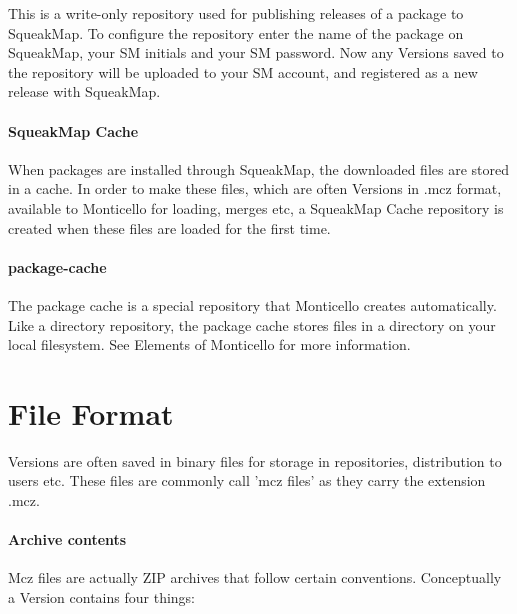 \documentclass[a4paper,10pt,twoside]{book}
\begin{document}
This is a write-only repository used for publishing releases of a package to SqueakMap. To configure the repository enter the name of the package on SqueakMap, your SM initials and your SM password. Now any Versions saved to the repository will be uploaded to your SM account, and registered as a new release with SqueakMap.

\paragraph{SqueakMap Cache}

When packages are installed through SqueakMap, the downloaded files are stored in a cache. In order to make these files, which are often Versions in .mcz format, available to Monticello for loading, merges etc, a SqueakMap Cache repository is created when these files are loaded for the first time.

\paragraph{package-cache}

The package cache is a special repository that Monticello creates automatically. Like a directory repository, the package cache stores files in a directory on your local filesystem. See Elements of Monticello for more information.


\section{File Format}

Versions are often saved in binary files for storage in repositories, distribution to users etc. These files are commonly call 'mcz files' as they carry the extension .mcz.

\paragraph{Archive contents}

Mcz files are actually ZIP archives that follow certain conventions. Conceptually a Version contains four things:
\end{document}
